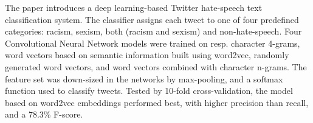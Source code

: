 The paper introduces a deep learning-based Twitter hate-speech text classification system. The classifier assigns each tweet to one of four predefined categories: racism, sexism, both (racism and sexism) and non-hate-speech. Four Convolutional Neural Network models were trained on resp. character 4-grams, word vectors based on semantic information built using word2vec, randomly generated word vectors, and word vectors combined with character n-grams. The feature set was down-sized in the networks by max-pooling, and a softmax function used to classify tweets. Tested by 10-fold cross-validation, the model based on word2vec embeddings performed best, with higher precision than recall, and a 78.3\% F-score.
